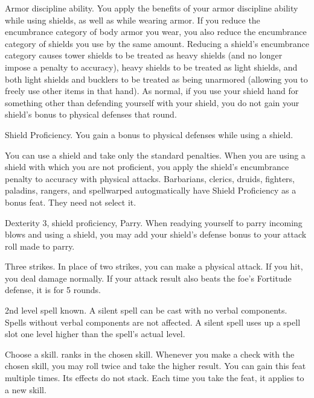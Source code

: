 \featpre Armor discipline ability.
\featben You apply the benefits of your armor discipline ability while using shields, as well as while wearing armor.
If you reduce the encumbrance category of body armor you wear, you also reduce the encumbrance category of shields you use by the same amount.
Reducing a shield's encumbrance category causes tower shields to be treated as heavy shields (and no longer impose a  penalty to accuracy), heavy shields to be treated as light shields, and both light shields and bucklers to be treated as being unarmored (allowing you to freely use other items in that hand).
As normal, if you use your shield hand for something other than defending yourself with your shield, you do not gain your shield's bonus to physical defenses that round.

\featpre Shield Proficiency.
\featben You gain a  bonus to physical defenses while using a shield.

\featben You can use a shield and take only the standard penalties.
When you are using a shield with which you are not proficient, you apply the shield's encumbrance penalty to accuracy with physical attacks.
Barbarians, clerics, druids, fighters, paladins, rangers, and spellwarped autogmatically have Shield Proficiency as a bonus feat.
They need not select it.

\featpres Dexterity 3, shield proficiency, Parry.
\featben When readying yourself to parry incoming blows and using a shield, you may add your shield's defense bonus to your attack roll made to parry.

\featpre Three strikes.
\featben In place of two strikes, you can make a physical attack.
If you hit, you deal damage normally.
If your attack result also beats the foe's Fortitude defense, it is \staggered for 5 rounds.

\featpre 2nd level spell known.
\featben A silent spell can be cast with no verbal components.
Spells without verbal components are not affected.
A silent spell uses up a spell slot one level higher than the spell's actual level.

Choose a skill.
 ranks in the chosen skill.
\featben Whenever you make a check with the chosen skill, you may roll twice and take the higher result.
You can gain this feat multiple times.
Its effects do not stack.
Each time you take the feat, it applies to a new skill.

